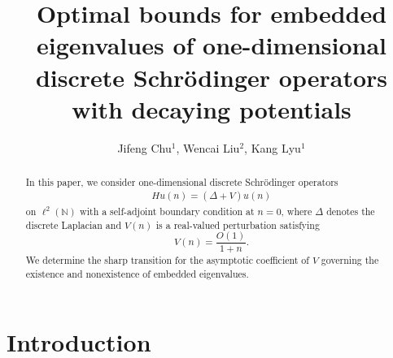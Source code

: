 \documentclass[12pt]{amsart}
\title[]{Optimal bounds for embedded eigenvalues  of one-dimensional discrete Schr\"odinger operators with decaying potentials}
\author[]
{Jifeng Chu$^{1}$, \quad Wencai Liu$^2$, \quad Kang Lyu$^{1}$}
\theoremstyle{plain}
\theoremstyle{definition}
\begin{document}
	
	
	
	
	\begin{abstract}
	In this paper, we consider one-dimensional discrete Schr\"odinger operators
	\begin{align}
		Hu(n)=(\Delta+V)u(n)\nonumber
	\end{align}
	on  $\ell^2(\mathbb{N})$ with a self-adjoint boundary condition at $n=0$, where $\Delta$ denotes the discrete Laplacian and $V(n)$ is a real-valued perturbation satisfying 
	$$V(n)=\frac{O(1)}{1+n}.$$ 
We determine the sharp transition for the asymptotic coefficient of \(V\) governing the existence and nonexistence of embedded eigenvalues.
\end{abstract}
\maketitle

\tableofcontents

\section{Introduction}\label{sec1}
\end{document}
